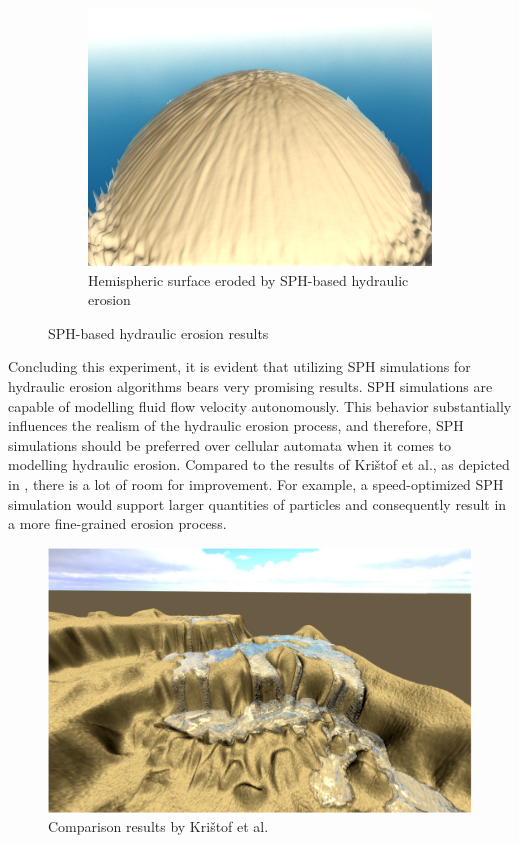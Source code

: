 \documentclass[11pt,a4paper,twoside,openright]{report}
\begin{document}
\begin{figure}[h]
\begin{subfigure}[b]{0.32\textwidth}
    \includegraphics[width=\textwidth]{sph-hydro-10mins-hemisphere.png}
    \caption{Hemispheric surface eroded by SPH-based hydraulic erosion}
    \label{fig:hydro6}
  \end{subfigure}
  \caption{SPH-based hydraulic erosion results}
\end{figure}

\noindent Concluding this experiment, it is evident that utilizing SPH simulations for hydraulic erosion algorithms bears very promising results. SPH simulations are capable of modelling fluid flow velocity autonomously. This behavior substantially influences the realism of the hydraulic erosion process, and therefore, SPH simulations should be preferred over cellular automata when it comes to modelling hydraulic erosion. Compared to the results of Kri\v{s}tof et al., as depicted in , there is a lot of room for improvement. For example, a speed-optimized SPH simulation would support larger quantities of particles and consequently result in a more fine-grained erosion process.

\begin{figure}[h]
\centering
\includegraphics[width=0.33\linewidth]{sph-comparison.png}
\caption{
  Comparison results by Kri\v{s}tof et al. \cite{krivstof2009hydraulic}
}
\label{fig:sphcomparison}
\end{figure}
\end{document}
